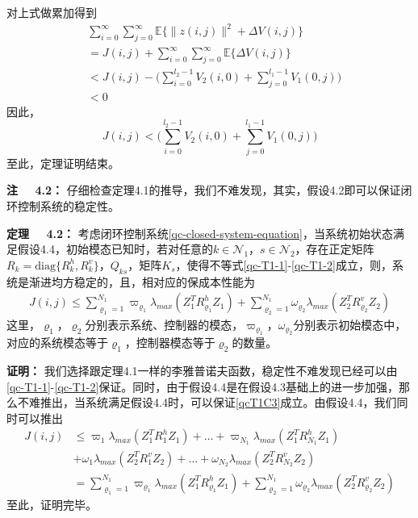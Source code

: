 	对上式做累加得到
	\begin{equation}
	\begin{split}
	&\sum_{i=0}^{\infty}\sum_{j=0}^{\infty}\mathbb{E}\{\|z(i,j)\|^{2}+\varDelta V(i,j) \}\\&=J(i,j)+\sum_{i=0}^{\infty}\sum_{j=0}^{\infty}\mathbb{E}\{\varDelta V(i,j) \}\\
	&<J(i,j)-\big( \sum_{i=0}^{l_2-1}V_2(i,0) + \sum_{j=0}^{l_1-1}V_{1}(0,j)\big)\\&<0
	\end{split}
	\end{equation}
	因此，
	\begin{equation}
		J(i,j)<\big( \sum_{i=0}^{l_2-1}V_2(i,0) + \sum_{j=0}^{l_1-1}V_{1}(0,j)\big)
	\end{equation}
	至此，定理证明结束。
	
	{\bf 注 \ \ 4.2：}
	仔细检查定理4.1的推导，我们不难发现，其实，假设4.2即可以保证闭环控制系统的稳定性。


	{\bf 定理 \ \ 4.2：}
	考虑闭环控制系统\eqref{qc-closed-system-equation}，当系统初始状态满足假设4.4，初始模态已知时，若对任意的$k\in\mathcal{N}_{1}$，$s\in\mathcal{N}_2$，存在正定矩阵$R_{k}=\mathrm{diag}\{R^{h}_{k},R^{v}_{k}\}$，$Q_{ks}$，矩阵$K_{s}$，使得不等式\eqref{qc-T1-1}-\eqref{qc-T1-2}成立，则，系统是渐进均方稳定的，且，相对应的保成本性能为
	\begin{equation}\label{qcT2}
	\begin{split}
	J(i,j) \leq \sum_{\varrho_{1}=1}^{N_{1}}\varpi_{\varrho_{1}}\lambda_{max}(Z^{T}_{1}R^{h}_{\varrho_{1}}Z_{1})
	+\sum_{\varrho_{2}=1}^{N_{1}}\omega_{\varrho_{2}}\lambda_{max}(Z^{T}_{2}R^{v}_{\varrho_{2}}Z_{2})
	\end{split}
	\end{equation}
	这里，$\varrho_{1}$，$\varrho_{2}$分别表示系统、控制器的模态，$\varpi_{\varrho_{1}}$，$\omega_{\varrho_{2}}$分别表示初始模态中，对应的系统模态等于$\varrho_{1}$，控制器模态等于$\varrho_{2}$的数量。
	
	{\bf 证明：} 
	我们选择跟定理4.1一样的李雅普诺夫函数，稳定性不难发现已经可以由\eqref{qc-T1-1}-\eqref{qc-T1-2}保证。同时，由于假设4.4是在假设4.3基础上的进一步加强，那么不难推出，当系统满足假设4.4时，可以保证\eqref{qcT1C3}成立。由假设4.4，我们同时可以推出
	\begin{equation}
		\begin{split}
			J(i,j)&\leq \varpi_1\lambda_{max}(Z^{T}_{1}R^{h}_{1}Z_{1})+\dots+\varpi_{N_{1}}\lambda_{max}(Z^{T}_{1}R^{h}_{N_{1}}Z_{1}) \\ 
			&+\omega_{1}\lambda_{max}(Z^{T}_{2}R^{v}_{1}Z_{2})+\dots+\omega_{N_{2}}\lambda_{max}(Z^{T}_{2}R^{v}_{N_2}Z_{2})\\
			&=\sum_{\varrho_{1}=1}^{N_{1}}\varpi_{\varrho_{1}}\lambda_{max}(Z^{T}_{1}R^{h}_{\varrho_{1}}Z_{1})
			+\sum_{\varrho_{2}=1}^{N_{1}}\omega_{\varrho_{2}}\lambda_{max}(Z^{T}_{2}R^{v}_{\varrho_{2}}Z_{2})
		\end{split}
	\end{equation}
	至此，证明完毕。
	

